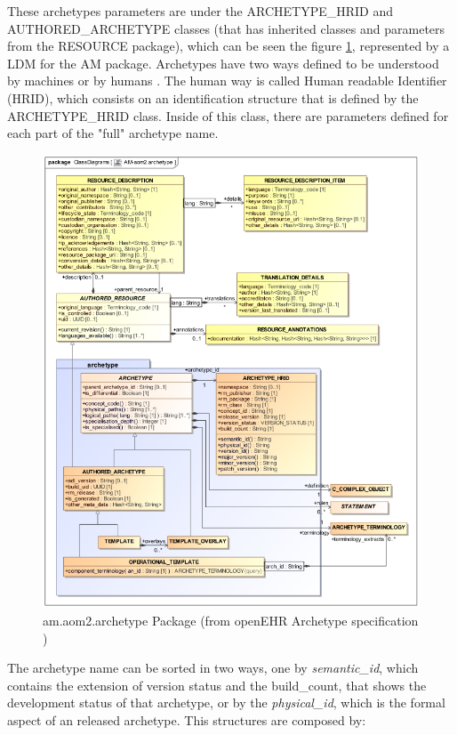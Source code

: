 \documentclass[mim_thesis.tex]{subfiles}
\begin{document}
These archetypes parameters are under the ARCHETYPE\_HRID and AUTHORED\_ARCHETYPE classes (that has inherited classes and parameters from the RESOURCE package), which can be seen the figure \ref{fig:RM_archtype}, represented by a \ac{LDM} for the AM package. Archetypes have two ways defined to be understood by machines or by humans \citep{openEHRarchver}. The human way is called Human readable Identifier (HRID), which consists on an identification structure that is defined by the ARCHETYPE\_HRID class. Inside of this class, there are parameters defined for each part of the "full" archetype name.

\begin{figure}[H]
	\centering
    \includegraphics[width=1.1\textwidth]{img/AM-aom2_archetype.png}
	\caption{am.aom2.archetype Package (from openEHR Archetype specification \citep{openEHRAOM})}
	\label{fig:RM_archtype}
\end{figure}

\newpage
The archetype name can be sorted in two ways, one by \textit{semantic\_id}, which contains the extension of version status and the build\_count, that shows the development status of that archetype, or by the \textit{physical\_id}, which is the formal aspect of an released archetype. This structures are composed by: \\
\end{document}
